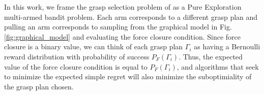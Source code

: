 \documentclass[journal,transmag]{IEEEtran}%
\begin{document}
%
%
%

In this work, we frame the grasp selection problem of  as a Pure Exploration multi-armed bandit problem.
Each arm corresponds to a different grasp plan and pulling an arm corresponds to sampling from the graphical model in Fig. \ref{fig:graphical_model} and evaluating the force closure condition.
Since force closure is a binary value, we can think of each grasp plan $\Gamma_i$ as having a Bernoulli reward distribution with probability of success $P_F(\Gamma_i)$.
Thus, the expected value of the force closure condition is equal to $P_F(\Gamma_i)$, and algorithms that seek to minimize the expected simple regret will also minimize the suboptimiality of the grasp plan chosen.
\end{document}
